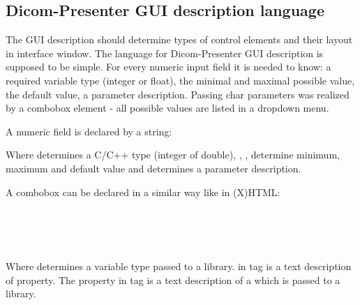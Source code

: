 \subsection{Dicom-Presenter GUI description language}

The GUI description should determine types of control elements and their layout in interface window. The language for Dicom-Presenter GUI description is supposed to be simple. For every numeric input field it is needed to know: a required variable type (integer or float), the minimal and maximal possible value, the default value, a parameter description. Passing char parameters was realized by a combobox element - all possible values are listed in a dropdown menu.

A numeric field is declared by a string:


Where  determines a C/C++ type (integer of double), , ,  determine minimum, maximum and default value and  determines a parameter description.

A combobox can be declared in a similar way like in (X)HTML:

\noindent \indent {}\\
\indent \indent {}\\
\indent \indent {}\\
\indent {}

Where  determines a variable type passed to a library.  in  tag is a text description of property. The  property in  tag is a text description of a  which is passed to a library.

\lstset{numbers=none,frame=none}

